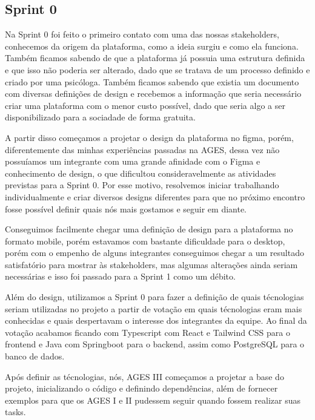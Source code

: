 \subsection{Sprint 0}

Na Sprint 0 foi feito o primeiro contato com uma das nossas stakeholders, conhecemos da origem da plataforma, como a ideia surgiu e como ela funciona. Também ficamos sabendo de que a plataforma já possuia uma estrutura definida e que isso não poderia ser alterado, dado que se tratava de um processo definido e criado por uma psicóloga. Também ficamos sabendo que existia um documento com diversas definições de design e recebemos a informação que seria necessário criar uma plataforma com o menor custo possível, dado que seria algo a ser disponibilizado para a sociadade de forma gratuita.

A partir disso começamos a projetar o design da plataforma no figma, porém, diferentemente das minhas experiências passadas na AGES, dessa vez não possuíamos um integrante com uma grande afinidade com o Figma e conhecimento de design, o que dificultou consideravelmente as atividades previstas para a Sprint 0. Por esse motivo, resolvemos iniciar trabalhando individualmente e criar diversos designs diferentes para que no próximo encontro fosse possível definir quais nós mais gostamos e seguir em diante.

Conseguimos facilmente chegar uma definição de design para a plataforma no formato mobile, porém estavamos com bastante dificuldade para o desktop, porém com o empenho de alguns integrantes conseguimos chegar a um resultado satisfatório para mostrar às stakeholders, mas algumas alterações ainda seriam necessárias e isso foi passado para a Sprint 1 como um débito.

Além do design, utilizamos a Sprint 0 para fazer a definição de quais técnologias seriam utilizadas no projeto a partir de votação em quais técnologias eram mais conhecidas e quais despertavam o interesse dos integrantes da equipe. Ao final da votação acabamos ficando com Typescript com React e Tailwind CSS para o frontend e Java com Springboot para o backend, assim como PostgreSQL para o banco de dados.

Após definir as técnologias, nós, AGES III começamos a projetar a base do projeto, inicializando o código e definindo dependências, além de fornecer exemplos para que os AGES I e II pudessem seguir quando fossem realizar suas tasks.
